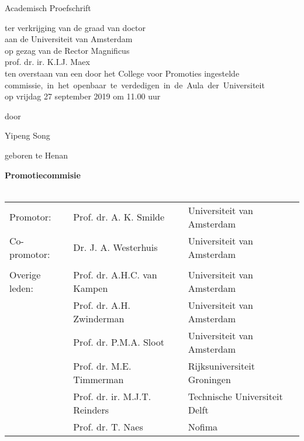 {%
\clearpage
\par\vskip 2cm
\begin{center}
\printtitle
\par\vspace {6cm}
{\large \sc Academisch Proefschrift}
\par\vspace {1cm}
{\large ter verkrijging van de graad van doctor\\
aan de Universiteit van Amsterdam\\
op gezag van de Rector Magnificus\\
prof. dr. ir. K.I.J. Maex \\                                 %
ten overstaan van een door het College voor Promoties ingestelde\\
\mbox{commissie, in het openbaar te verdedigen in de Aula der Universiteit}\\        %
op vrijdag 27 september 2019 om 11.00 uur \\ }        %
\par\vspace {1cm} {\large door}
\par \vspace {1cm} %
{\Large Yipeng Song \\}                        %
\par\vspace {1cm} %
{\large geboren te Henan} %
\end{center}

\clearpage
\par\vskip 2cm

\noindent%
{\bf Promotiecommisie}\\
\\
\begin{tabular}[t]{@{}lll}
Promotor:      & Prof. dr. A. K. Smilde & Universiteit van Amsterdam \\  %
Co-promotor:   & Dr. J. A. Westerhuis   & Universiteit van Amsterdam \\  %
\\
Overige leden: & Prof. dr. A.H.C. van Kampen  & Universiteit van Amsterdam \\  %
               & Prof. dr. A.H. Zwinderman  & Universiteit van Amsterdam \\  %
               & Prof. dr. P.M.A. Sloot  & Universiteit van Amsterdam \\  %
               & Prof. dr. M.E. Timmerman & Rijksuniversiteit Groningen \\
               & Prof. dr. ir. M.J.T. Reinders & Technische Universiteit Delft \\
               & Prof. dr. T. Naes  & Nofima
\end{tabular}\\
\\

}
